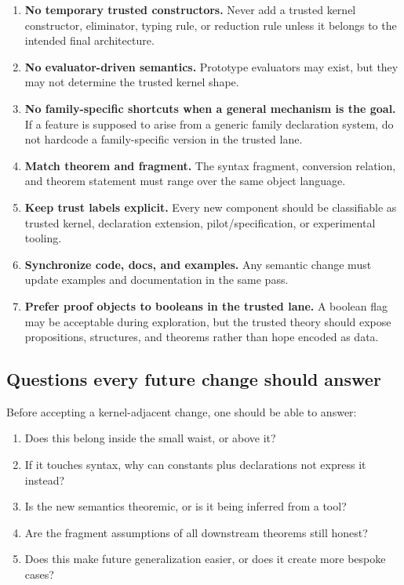\documentclass[11pt]{article}
\begin{document}
\begin{enumerate}[leftmargin=2em,label=\textbf{R\arabic*.}]
  \item \textbf{No temporary trusted constructors.}
  Never add a trusted kernel constructor, eliminator, typing rule, or reduction
  rule unless it belongs to the intended final architecture.

  \item \textbf{No evaluator-driven semantics.}
  Prototype evaluators may exist, but they may not determine the trusted kernel
  shape.

  \item \textbf{No family-specific shortcuts when a general mechanism is the
  goal.}
  If a feature is supposed to arise from a generic family declaration system,
  do not hardcode a family-specific version in the trusted lane.

  \item \textbf{Match theorem and fragment.}
  The syntax fragment, conversion relation, and theorem statement must range
  over the same object language.

  \item \textbf{Keep trust labels explicit.}
  Every new component should be classifiable as trusted kernel, declaration
  extension, pilot/specification, or experimental tooling.

  \item \textbf{Synchronize code, docs, and examples.}
  Any semantic change must update examples and documentation in the same pass.

  \item \textbf{Prefer proof objects to booleans in the trusted lane.}
  A boolean flag may be acceptable during exploration, but the trusted theory
  should expose propositions, structures, and theorems rather than hope encoded
  as data.
\end{enumerate}

\subsection{Questions every future change should answer}

Before accepting a kernel-adjacent change, one should be able to answer:
\begin{enumerate}[leftmargin=2em]
  \item Does this belong inside the small waist, or above it?
  \item If it touches syntax, why can constants plus declarations not express it
  instead?
  \item Is the new semantics theoremic, or is it being inferred from a tool?
  \item Are the fragment assumptions of all downstream theorems still honest?
  \item Does this make future generalization easier, or does it create more
  bespoke cases?
\end{enumerate}
\end{document}
